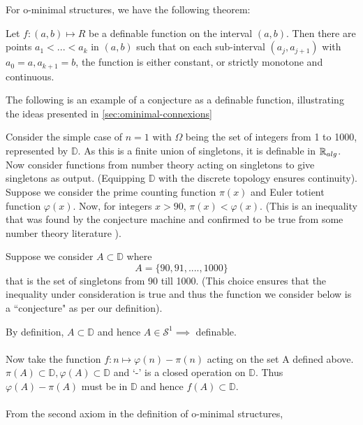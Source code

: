 For o-minimal structures, we have the following theorem:
\begin{theorem}[Monotinicity]
    \label{thm:monotonicity}
    Let $f:(a,b)\mapsto R$ be a definable function on the interval $(a,b).$ Then there are points $a_1 < ... < a_k$ in $(a,b)$ such that on each sub-interval $(a_j, a_{j+1})$ with $a_0 = a, a_{k+1} = b$, the function is either constant, or strictly monotone and continuous.
\end{theorem}

The following is an example of a conjecture as a definable function, illustrating the ideas presented in \ref{sec:ominimal-connexions}
\begin{exmp}
    Consider the simple case of $n=1$ with $\Omega$ being the set of integers from 1 to 1000, represented by $\mathbb{D}$.
    As this is a finite union of singletons, it is definable in $\mathbb{R}_{alg}$. Now consider functions from number theory acting on singletons to give singletons as output. (Equipping $\mathbb{D}$ with the discrete topology ensures continuity). Suppose we consider the prime counting function $\pi(x)$ and Euler totient function $\varphi(x)$. Now, for integers $x > 90$, $\pi(x) < \varphi(x)$. (This is an inequality that was found by the conjecture machine and confirmed to be true from some number theory literature \cite{moser1951}).

    Suppose we consider $A\subset\mathbb{D}$ where
    \begin{equation*}
        A = \{90, 91,....,1000\}
    \end{equation*}
    that is the set of singletons from 90 till 1000. (This choice ensures that the inequality under consideration is true and thus the function we consider below is a ``conjecture" as per our definition).

    By definition, $A\subset\mathbb{D}$ and hence $A\in\mathcal{S}^1 \implies $ definable.
    \\\\
    Now take the function $f: n\mapsto\varphi(n) - \pi(n)$ acting on the set A defined above. $\pi(A)\subset\mathbb{D}, \varphi(A)\subset\mathbb{D}$ and `-' is a closed operation on $\mathbb{D}$. Thus $\varphi(A) - \pi(A)$ must be in $\mathbb{D}$ and hence $f(A)\subset\mathbb{D}$.
    \\\\
    From the second axiom in the definition of o-minimal structures,


\end{exmp}
